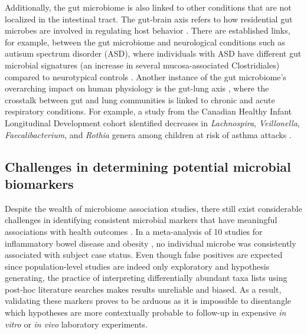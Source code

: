Additionally, the gut microbiome is also linked to other conditions that are not localized in the intestinal tract. The gut-brain axis refers to how residential gut microbes are involved in regulating host behavior \cite{morais2021gut}. There are established links, for example, between the gut microbiome and neurological conditions such as autisum spectrum disorder (ASD), where individuals with ASD have different gut microbial signatures (an increase in several mucosa-associated Clostridiales) compared to neurotypical controls \cite{luna2017distinct}. Another instance of the gut microbiome's overarching impact on human physiology is the gut-lung axis \cite{enaud2020gutlung}, where the crosstalk between gut and lung communities is linked to chronic and acute respiratory conditions. For example, a study from the Canadian Healthy Infant Longitudinal Development cohort identified decreases in \emph{Lachnospira}, \emph{Veillonella}, \emph{Faecalibacterium}, and \emph{Rothia} genera among children at risk of asthma attacks \cite{arrieta2015early}. 


\subsection{Challenges in determining potential microbial biomarkers}
Despite the wealth of microbiome association studies, there still exist considerable challenges in identifying consistent microbial markers that have meaningful associations with health outcomes \cite{duvallet2017metaanalysis}. In a meta-analysis of 10 studies for inflammatory bowel disease and obesity \cite{walters2014metaanalyses}, no individual microbe was consistently associated with subject case status. Even though false positives are expected since population-level studies are indeed only exploratory and hypothesis generating, the practice of interpreting differentially abundant taxa lists using post-hoc literature searches makes results unreliable and biased. As a result, validating these markers proves to be arduous as it is impossible to disentangle which hypotheses are more contextually probable to follow-up in expensive \emph{in vitro} or \emph{in vivo} laboratory experiments.  

